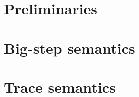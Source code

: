 \chapter{Preliminaries}
\label{sec_preliminaries}


\chapter{Big-step semantics}
\label{sec_big-step_semantics}


\chapter{Trace semantics}
\label{sec_de_sem_trace}


%

%


